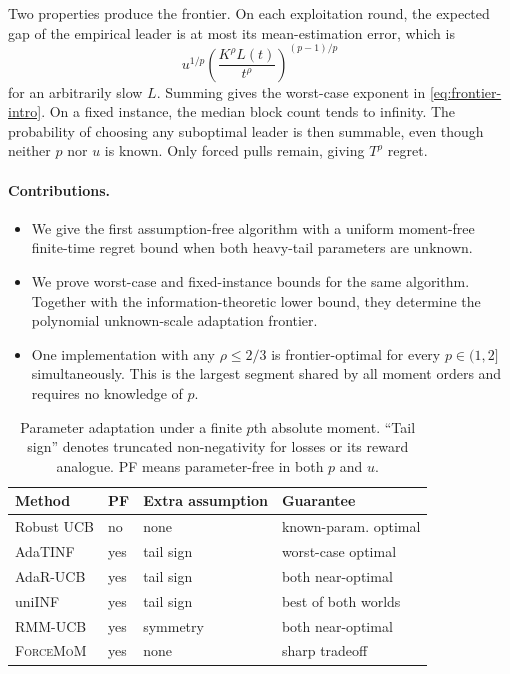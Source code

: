 \documentclass[twoside]{article}
\newcommand{\FM}{\textnormal{\textsc{ForceMoM}}}
\begin{document}
Two properties produce the frontier. On each exploitation round, the
expected gap of the empirical leader is at most its mean-estimation error,
which is
\[
 u^{1/p}\left(\frac{K^\rho L(t)}{t^\rho}\right)^{(p-1)/p}
\]
for an arbitrarily slow $L$. Summing gives the worst-case exponent in
\eqref{eq:frontier-intro}. On a fixed instance, the median block count tends
to infinity. The probability of choosing any suboptimal leader is then
summable, even though neither $p$ nor $u$ is known. Only forced pulls remain,
giving $T^\rho$ regret.

\paragraph{Contributions.}
\begin{itemize}
\item We give the first assumption-free algorithm with a uniform moment-free
finite-time regret bound when both heavy-tail parameters are unknown.
\item We prove worst-case and fixed-instance bounds for the same algorithm.
Together with the information-theoretic lower bound, they determine the
polynomial unknown-scale adaptation frontier.
\item One implementation with any $\rho\leq2/3$ is frontier-optimal for every
$p\in(1,2]$ simultaneously. This is the largest segment shared by all moment
orders and requires no knowledge of $p$.
\end{itemize}

\begin{table}[t]
\caption{Parameter adaptation under a finite $p$th absolute moment. ``Tail
sign'' denotes truncated non-negativity for losses or its reward analogue.
PF means parameter-free in both $p$ and $u$.}
\label{tab:comparison}
\centering
\scriptsize
\begin{tabular}{@{}llll@{}}
\toprule
Method & PF & Extra assumption & Guarantee\\
\midrule
Robust UCB & no & none & known-param. optimal\\
AdaTINF & yes & tail sign & worst-case optimal\\
AdaR-UCB & yes & tail sign & both near-optimal\\
uniINF & yes & tail sign & best of both worlds\\
RMM-UCB & yes & symmetry & both near-optimal\\
\FM{} & yes & none & sharp tradeoff\\
\bottomrule
\end{tabular}
\end{table}
\end{document}
